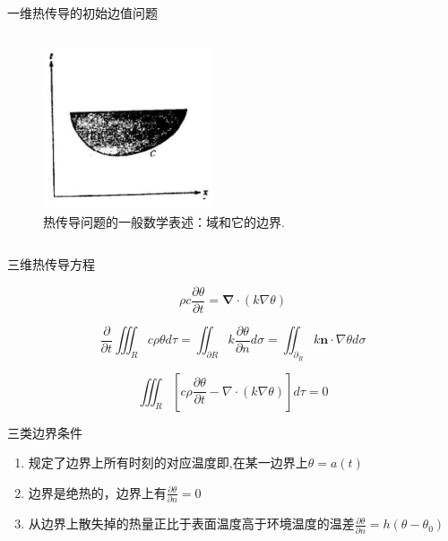 \documentclass[10pt]{beamer}
\begin{document}
\begin{frame}[allowframebreaks]{一维热传导的初始边值问题}
\begin{columns}
  \begin{figure}[htp]
    \centering
    \includegraphics[width=5cm]{1.4.jpeg}
    \caption{热传导问题的一般数学表述：域和它的边界.}
    \label{fig:1.4}
  \end{figure}
\end{columns}


\end{frame}

\begin{frame}[allowframebreaks]{三维热传导方程}

\begin{equation}
\rho c \frac{\partial \theta}{\partial t}=\mathbf{\nabla} \cdot(k \nabla \theta)
\end{equation}

\begin{equation}
\frac{\partial}{\partial t} \iiint_{R} c \rho \theta d \tau=\iint_{\partial R} k \frac{\partial \theta}{\partial n} d \sigma=\iint_{\partial_{R}} k \mathbf{n} \cdot \nabla \theta d \sigma
\end{equation}

	
\begin{equation}
\iiint_{R}\left[c \rho \frac{\partial \theta}{\partial t}-\nabla \cdot(k \nabla \theta)\right] d \tau=0
\end{equation}

\end{frame}

\begin{frame}[allowframebreaks]{三类边界条件}

\begin{enumerate}
  \item 规定了边界上所有时刻的对应温度即,在某一边界上$\theta  =a\left ( t\right )$
  \item 边界是绝热的，边界上有$\frac{\partial \theta }{\partial n}=0$
  \item 从边界上散失掉的热量正比于表面温度高于环境温度的温差$\frac{\partial \theta }{\partial n}=h\left ( \theta -\theta _{0}\right )$
\end{enumerate}

\end{frame}
\end{document}
